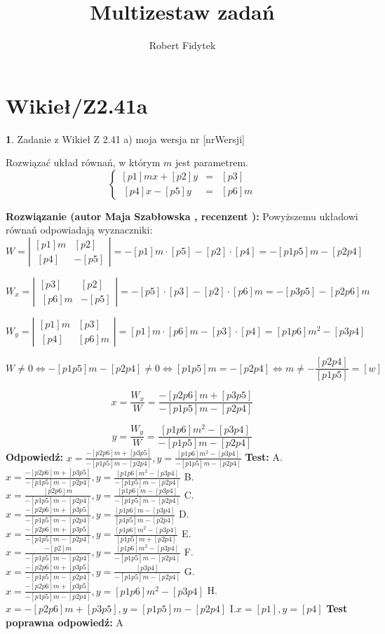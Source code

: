 \documentclass[12pt, a4paper]{article}
\title{Multizestaw zadań}
\author{Robert Fidytek}
\date{}
\theoremstyle{definition} %
\newtheorem{zad}{}
\newcommand{\kategoria}[1]{\section{#1}} %
\newcommand{\zadStart}[1]{\begin{zad}#1\newline} %
\newcommand{\zadStop}{\end{zad}}   %
\newcommand{\rozwStart}[2]{\noindent \textbf{Rozwiązanie (autor #1 , recenzent #2): }\newline} %
\newcommand{\rozwStop}{\newline}                                            %
\newcommand{\odpStart}{\noindent \textbf{Odpowiedź:}\newline}    %
\newcommand{\odpStop}{\newline}                                             %
\newcommand{\testStart}{\noindent \textbf{Test:}\newline} %
\newcommand{\testStop}{\newline} %
\newcommand{\kluczStart}{\noindent \textbf{Test poprawna odpowiedź:}\newline} %
\newcommand{\kluczStop}{\newline} %
\begin{document}
\maketitle


\kategoria{Wikieł/Z2.41a}
\zadStart{Zadanie z Wikieł Z 2.41 a)  moja wersja nr [nrWersji]}

Rozwiązać układ równań, w którym $m$ jest parametrem.
$$\left\{\begin{array}{ccc}
[p1]mx+[p2]y&=&[p3]\\
\ [p4]x-[p5]y&=&[p6]m
\end{array} \right.$$

\zadStop
\rozwStart{Maja Szabłowska}{}
Powyższemu układowi równań odpowiadają wyznaczniki:
$$W=\left| \begin{array}{lccr} [p1]m & [p2] \\ \ [p4] & -[p5] \end{array}\right| = -[p1]m\cdot[p5] - [p2]\cdot[p4]=-[p1p5]m-[p2p4]$$

$$W_{x}=\left| \begin{array}{lccr} [p3] & [p2] \\ \ [p6]m & -[p5] \end{array}\right| = -[p5]\cdot[p3] - [p2]\cdot[p6]m=-[p3p5]-[p2p6]m$$

$$W_{y}=\left| \begin{array}{lccr} [p1]m & [p3] \\ \ [p4] & [p6]m \end{array}\right| = [p1]m\cdot[p6]m - [p3]\cdot[p4]=[p1p6]m^{2}-[p3p4]$$

$$W\neq 0 \iff -[p1p5]m-[p2p4]\neq 0 \iff [p1p5]m=-[p2p4] \iff m\neq -\frac{[p2p4]}{[p1p5]}=[w]$$

$$x=\frac{W_{x}}{W}=\frac{-[p2p6]m+[p3p5]}{-[p1p5]m-[p2p4]}$$

$$y=\frac{W_{y}}{W}=\frac{[p1p6]m^{2}-[p3p4]}{-[p1p5]m-[p2p4]}$$
\rozwStop
\odpStart
$x=\frac{-[p2p6]m+[p3p5]}{-[p1p5]m-[p2p4]}, y=\frac{[p1p6]m^{2}-[p3p4]}{-[p1p5]m-[p2p4]}$
\odpStop
\testStart
A.$x=\frac{-[p2p6]m+[p3p5]}{-[p1p5]m-[p2p4]}, y=\frac{[p1p6]m^{2}-[p3p4]}{-[p1p5]m-[p2p4]}$
B.$x=\frac{[p2p6]m}{-[p1p5]m-[p2p4]}, y=\frac{[p1p6]m-[p3p4]}{-[p1p5]m-[p2p4]}$
C.$x=\frac{-[p2p6]m+[p3p5]}{-[p1p5]m-[p2p4]}, y=\frac{[p1p6]m-[p3p4]}{[p1p5]m-[p2p4]}$
D.$x=\frac{-[p2p6]m+[p3p5]}{-[p1p5]m-[p2p4]}, y=\frac{[p1p6]m^{2}-[p3p4]}{[p1p5]m+[p2p4]}$
E.$x=\frac{-[p2]m}{-[p1p5]m-[p2p4]}, y=\frac{[p1p6]m^{2}-[p3p4]}{-[p1p5]m-[p2p4]}$
F.$x=\frac{-[p2p6]m+[p3p5]}{-[p1p5]m-[p2p4]}, y=\frac{[p3p4]}{-[p1p5]m-[p2p4]}$
G.$x=\frac{-[p2p6]m+[p3p5]}{-[p1p5]m-[p2p4]}, y=[p1p6]m^{2}-[p3p4]$
H.$x=-[p2p6]m+[p3p5], y=[p1p5]m-[p2p4]$
I.$x=[p1], y=[p4]$
\testStop
\kluczStart
A
\kluczStop
\end{document}
